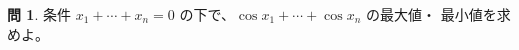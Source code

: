 \documentclass[a4paper]{jsarticle}
\theoremstyle{definition}
\newtheorem{Exercise}{問}%
\theoremstyle{remark}
\newcommand{\Z}{\text{\ym Z}}
\begin{document}
\begin{Exercise}
 条件 $x_1+ \cdots + x_n = 0$ の下で、$\cos x_1 + \cdots + \cos x_n$ の最大値・ 最小値を求めよ。



  \end{Exercise}
\end{document}
